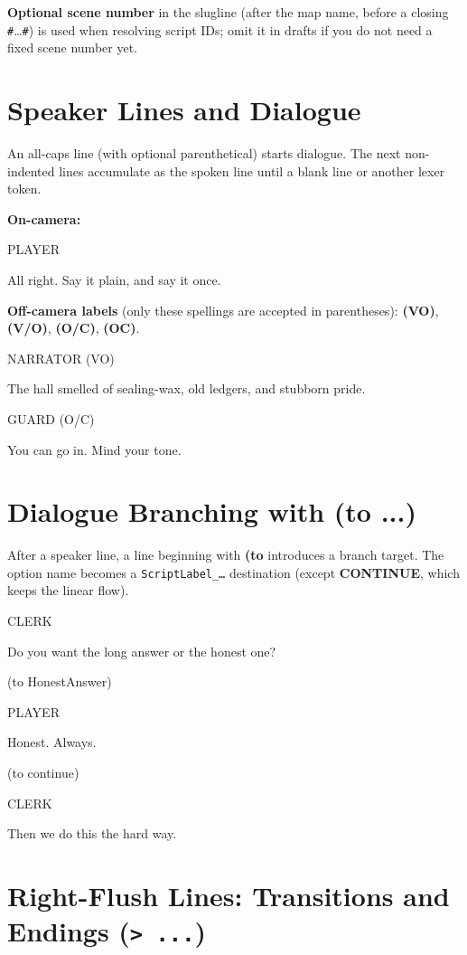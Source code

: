 \documentclass[11pt,letterpaper,oldstylefigures]{memoir}
\newcommand{\speaker}[1]{\nobreak\hspace*{0.333\textwidth}\MakeUppercase{#1}\par\nobreak\vspace{0.5\baselineskip}}
\newcommand{\dialogue}[1]{\nobreak\hspace*{0.25\textwidth}\begin{minipage}{0.5\textwidth}#1\end{minipage}\par\vspace{1\baselineskip}}
\newcommand{\stagedir}[1]{#1\par\vspace{1\baselineskip}}
\newenvironment{FountainExample}
  {\begingroup
  \ttfamily\small
   \setlength{\parindent}{0pt}
  \setlength{\parskip}{0.5em}
  \allowdisplaybreaks
  \setlength{\displaywidowpenalty}{0}
  \setlength{\widowpenalty}{0}
  \setlength{\clubpenalty}{0}
  \setlength{\interlinepenalty}{0}
}
  {\endgroup}
\newcommand{\fountain}[1]{\textbf{#1}}
\begin{document}
\textbf{Optional scene number} in the slugline (after the map name, before a closing \texttt{\#}\ldots\texttt{\#}) is used when resolving script IDs; omit it in drafts if you do not need a fixed scene number yet.

\section{Speaker Lines and Dialogue}

An all-caps line (with optional parenthetical) starts dialogue. The next non-indented lines accumulate as the spoken line until a blank line or another lexer token.

\textbf{On-camera:}

\begin{FountainExample}
\speaker{PLAYER}
\dialogue{All right. Say it plain, and say it once.}
\end{FountainExample}

\textbf{Off-camera labels} (only these spellings are accepted in parentheses): \fountain{(VO)}, \fountain{(V/O)}, \fountain{(O/C)}, \fountain{(OC)}.

\begin{FountainExample}
\speaker{NARRATOR (VO)}
\dialogue{The hall smelled of sealing-wax, old ledgers, and stubborn pride.}

\speaker{GUARD (O/C)}
\dialogue{You can go in. Mind your tone.}
\end{FountainExample}

\section{Dialogue Branching with \fountain{(to ...)}}

After a speaker line, a line beginning with \fountain{(to } introduces a branch target. The option name becomes a \texttt{ScriptLabel\_\ldots} destination (except \fountain{CONTINUE}, which keeps the linear flow).

\begin{FountainExample}
\speaker{CLERK}
\dialogue{Do you want the long answer or the honest one?}

\stagedir{(to HonestAnswer)}
\speaker{PLAYER}
\dialogue{Honest. Always.}

\stagedir{(to continue)}
\speaker{CLERK}
\dialogue{Then we do this the hard way.}
\end{FountainExample}

\section{Right-Flush Lines: Transitions and Endings (\texttt{> ...})}
\end{document}
